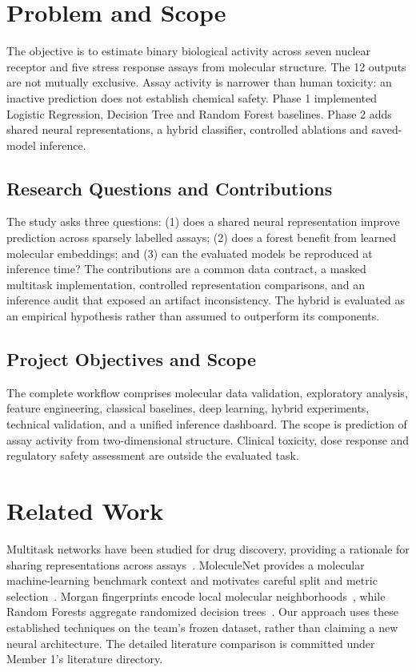 \documentclass[11pt,a4paper]{article}\usepackage[margin=25mm]{geometry}\usepackage{fancyhdr}\usepackage{setspace}\usepackage{titlesec}\usepackage{xcolor}
\begin{document}
\section{Problem and Scope}
The objective is to estimate binary biological activity across seven nuclear receptor and five stress response assays from molecular structure. The 12 outputs are not mutually exclusive. Assay activity is narrower than human toxicity: an inactive prediction does not establish chemical safety. Phase 1 implemented Logistic Regression, Decision Tree and Random Forest baselines. Phase 2 adds shared neural representations, a hybrid classifier, controlled ablations and saved-model inference.

\subsection{Research Questions and Contributions}
The study asks three questions: (1) does a shared neural representation improve prediction across sparsely labelled assays; (2) does a forest benefit from learned molecular embeddings; and (3) can the evaluated models be reproduced at inference time? The contributions are a common data contract, a masked multitask implementation, controlled representation comparisons, and an inference audit that exposed an artifact inconsistency. The hybrid is evaluated as an empirical hypothesis rather than assumed to outperform its components.

\subsection{Project Objectives and Scope}
The complete workflow comprises molecular data validation, exploratory analysis, feature engineering, classical baselines, deep learning, hybrid experiments, technical validation, and a unified inference dashboard. The scope is prediction of assay activity from two-dimensional structure. Clinical toxicity, dose response and regulatory safety assessment are outside the evaluated task.

\section{Related Work}
Multitask networks have been studied for drug discovery, providing a rationale for sharing representations across assays~\cite{ramsundar}. MoleculeNet provides a molecular machine-learning benchmark context and motivates careful split and metric selection~\cite{moleculenet}. Morgan fingerprints encode local molecular neighborhoods~\cite{morgan}, while Random Forests aggregate randomized decision trees~\cite{breiman}. Our approach uses these established techniques on the team's frozen dataset, rather than claiming a new neural architecture. The detailed literature comparison is committed under Member 1's literature directory.
\end{document}
